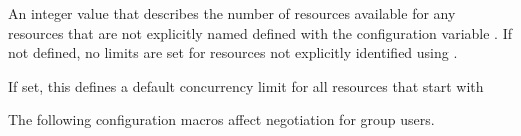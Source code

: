 \begin{description}
\label{param:ConcurrencyLimitDefault}
\item[\Macro{CONCURRENCY\_LIMIT\_DEFAULT}]
  An integer value that describes the number of resources available for
  any resources that are not explicitly named defined with the
  configuration variable .
  If not defined, no limits are set for resources not explicitly identified
  using .

\label{param:ConcurrencyLimitDefaultName}
\item[\Macro{CONCURRENCY\_LIMIT\_DEFAULT\_<NAME>}]
	If set, this defines a default concurrency limit for all resources
that start with 

\end{description}

The following configuration macros affect negotiation for group users.
